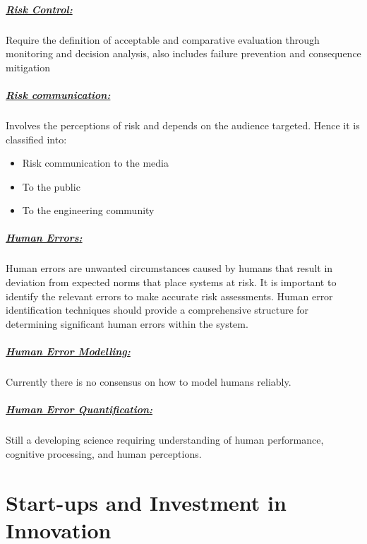 \documentclass[8pt]{extreport}
\begin{document}
{\begin{itemize}
\paragraph{\underline{Risk Control:}} Require the definition of acceptable and comparative evaluation through monitoring and decision analysis, also includes failure prevention and consequence mitigation
\paragraph{\underline{Risk communication:}} Involves the perceptions of risk and depends on the audience targeted. Hence it is classified into:
\begin{itemize}
\item Risk communication to the media
\item To the public
\item To the engineering community
\end{itemize}

\paragraph{\underline{Human Errors:}} Human errors are unwanted circumstances caused by humans that result in deviation from expected norms that place systems at risk. It is important to identify the relevant errors to make accurate risk assessments. Human error identification techniques should provide a comprehensive structure for determining significant human errors within the system.
\paragraph{\underline{Human Error Modelling:}} Currently there is no consensus on how to model humans reliably.
\paragraph{\underline{Human Error Quantification:}} Still a developing science requiring understanding of human performance, cognitive processing, and human perceptions.

\end{itemize}
\chapter{\Large{Start-ups and Investment in Innovation}}
}
\end{document}
